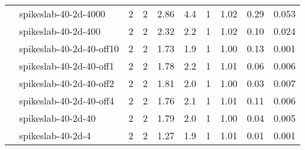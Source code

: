 \begin{tabular}{ll|rrcccccc}
                     & spikeslab-40-2d-4000 & 2   & 2    & 2.86 & 4.4 &    1 & 1.02 & 0.29 & 0.053 \\
                     & spikeslab-40-2d-400  & 2   & 2    & 2.32 & 2.2 &    1 & 1.02 & 0.10 & 0.024 \\
                     & spikeslab-40-2d-40-off10 & 2   & 2    & 1.73 & 1.9 &    1 & 1.00 & 0.13 & 0.001 \\
                     & spikeslab-40-2d-40-off1 & 2   & 2    & 1.78 & 2.2 &    1 & 1.01 & 0.06 & 0.006 \\
                     & spikeslab-40-2d-40-off2 & 2   & 2    & 1.81 & 2.0 &    1 & 1.00 & 0.03 & 0.007 \\
                     & spikeslab-40-2d-40-off4 & 2   & 2    & 1.76 & 2.1 &    1 & 1.01 & 0.11 & 0.006 \\
                     & spikeslab-40-2d-40   & 2   & 2    & 1.79 & 2.0 &    1 & 1.00 & 0.04 & 0.005 \\
                     & spikeslab-40-2d-4    & 2   & 2    & 1.27 & 1.9 &    1 & 1.01 & 0.01 & 0.001 \\
\end{tabular}
